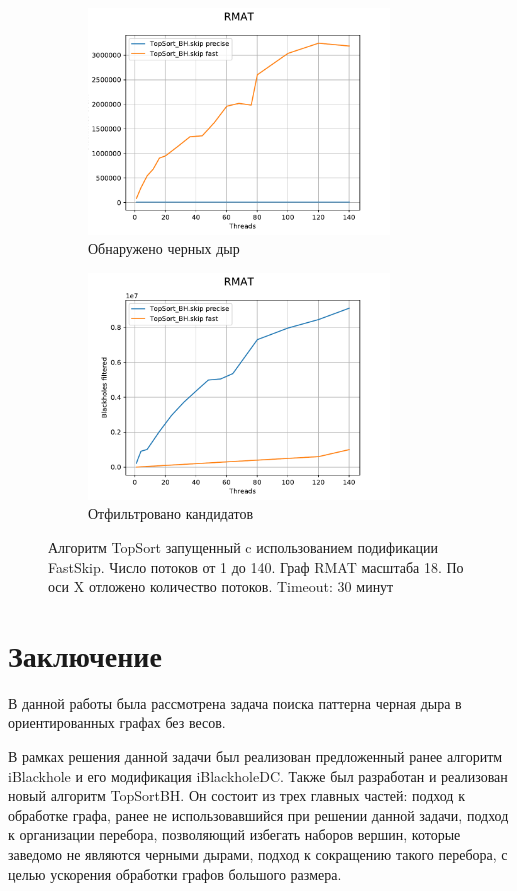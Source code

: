 \documentclass[12pt,a4paper,oneside,openany]{article}
\theoremstyle{definition}
\theoremstyle{lemma}
\theoremstyle{remark}
\begin{document}
\begin{figure}[H]
    \begin{subfigure}{.5\textwidth}
      \centering
      \includegraphics[width=8cm]{images/8_count.pdf}
      \caption{Обнаружено черных дыр}
      \label{fig:fastskipmanythreads:count}
    \end{subfigure}
    \begin{subfigure}{.5\textwidth}
      \centering
      \includegraphics[width=8cm]{images/8_filtered.pdf}
      \caption{Отфильтровано кандидатов}
      \label{fig:fastskipmanythreads:filtered}
    \end{subfigure}
    \caption{Алгоритм TopSort запущенный c использованием подификации FastSkip. Число потоков от 1 до 140. Граф RMAT масштаба 18. По оси X отложено количество потоков. Timeout: 30 минут}
    \label{fig:fastskipmanythreads}
\end{figure}

\cleardoublepage
\section{Заключение}\label{sec:conclusion}
В данной работы была рассмотрена задача поиска паттерна черная дыра
в ориентированных графах без весов.

В рамках решения данной задачи был реализован предложенный ранее алгоритм iBlackhole и его модификация
iBlackholeDC. Также был разработан и реализован новый алгоритм TopSortBH.
Он состоит из трех главных частей: подход к обработке графа, ранее не
использовавшийся при решении данной задачи, подход к организации перебора,
позволяющий избегать наборов вершин, которые заведомо не являются черными дырами,
подход к сокращению такого перебора, с целью ускорения обработки графов большого размера.
\end{document}
